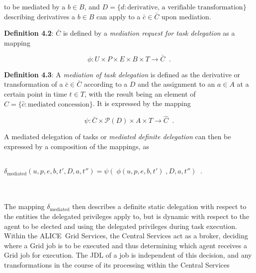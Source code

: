 \documentclass[10pt]{iopart}
\newcommand{\alice}{ALICE}
\begin{document}
to be mediated by a $ b \in B$, and 
$D = \{ d: \textrm{derivative, a verifiable transformation}\}$ 
describing derivatives a $b \in B$ can apply to a $\bar{c} \in \bar{C}$ upon mediation.\\
\par
\begingroup
\leftskip=0.4cm \noindent
\textbf{Definition 4.2}: $\bar{C}$ is defined by 
a \textit{mediation request for task delegation} as a mapping
\par
\endgroup\noindent
\begin{center}
\begin{equation}\tag{f 4.2}\label{phi}\phi: U \times P \times E \times B \times
T \rightarrow
\bar{C}\;\;.\end{equation}
\end{center}
\par
\begingroup
\leftskip=0.4cm \noindent
\textbf{Definition 4.3}: A \textit{mediation of task delegation} is defined as
the derivative or transformation of a $\bar{c} \in \bar{C}$ according to a $D$
and the assignment to an $ a \in A$ at a certain point in time $t \in T$,
with the result being an element of $ \hat{C} =
\{ \hat{c}: \textrm{mediated concession} \}$. It is expressed by the mapping
\par
\endgroup\noindent
\begin{center}
\begin{equation}\tag{f 4.3}\label{psi}\psi: \bar{C}
\times \mathcal{P}(D) \times A \times T \rightarrow \hat{C}\;\;.\end{equation}
\end{center}
A mediated delegation of tasks or \textit{mediated definite delegation}
can then be expressed by a composition of the mappings, as \\\\
\centerline{$\delta_{\text{mediated}}(u, p, e, b, t', D, a,
t'') = \psi(\;\phi(u,p,e,b,t')\;,D,a,t'')\;\;.$}\\\\
The mapping $\delta_{\text{mediated}}$ then describes a definite static
delegation with respect to the entities the delegated privileges apply to, but is dynamic with
respect to the agent to be elected and using the delegated privileges during
task execution.\\
Within the \alice\ Grid Services, the Central Services act as a broker,
deciding where a Grid job is to be executed and thus determining which
agent receives a Grid job for execution. The JDL of a job is independent
of this decision, and any transformations in the course of its processing within the Central Services 
\end{document}
